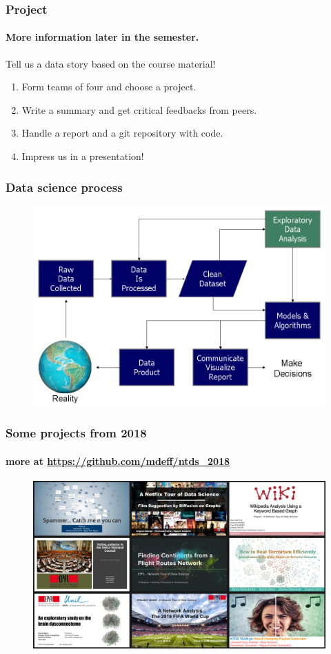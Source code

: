 \documentclass[aspectratio=169]{beamer}
\begin{document}
\begin{frame}
	\frametitle{Project}
	\framesubtitle{More information later in the semester.}
	\begin{center}
		Tell us a data story based on the course material!
	\end{center}
	\vfill
	\begin{enumerate}
		\item Form teams of four and choose a project.
		\vfill
		\item Write a summary and get critical feedbacks from peers. %
		\vfill
		\item Handle a report and a git repository with code.
		\vfill
		\item Impress us in a presentation!
	\end{enumerate}
\end{frame}



\begin{frame}
	\frametitle{Data science process}
	\begin{figure}
		\includegraphics[height=0.85\textheight]{data_science_process}
	\end{figure}
\end{frame}


\begin{frame}
	\frametitle{Some projects from 2018}
	\framesubtitle{more at \url{https://github.com/mdeff/ntds_2018}}
	\begin{figure}
		\includegraphics[width=0.87\linewidth]{projects_2018}
	\end{figure}
\end{frame}
\end{document}
